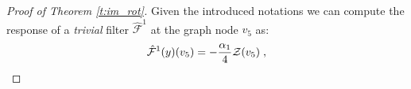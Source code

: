 \documentclass[10pt,journal,compsoc]{IEEEtran}
\newcommand{\hmF}{\hat{\mathcal{F}}}
\begin{document}
\begin{proof}[Proof of Theorem \ref{t:im_rot}]

		Given the introduced notations we can compute the response of a \emph{trivial} filter $\hmF^1$ at the graph node $v_5$ as:
		\begin{equation}
		\small
		\hmF^1(y)(v_5) = - \frac{\alpha_1 }{4} \mathcal{Z}(v_5)\;,
		\label{eq:response_pat_o}
		\end{equation}



\end{proof}
\end{document}
